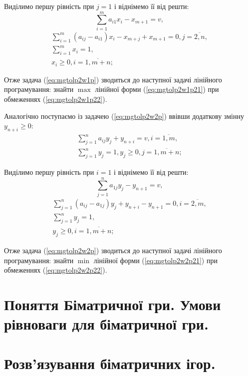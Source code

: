 \documentclass[12pt,a4paper]{report}
\begin{document}
Виділимо першу рівність при $j=1$ і віднімемо її від решти:
\begin{equation} \sum_{i=1}^m a_{i 1} x_i  - x_{m+1} = v, \label{eq:mgtolp2w1p21} \end{equation}
\begin{equation}
\begin{array}{l}
\displaystyle \sum_{i=1}^m (a_{ij} - a_{i 1}) x_i  - x_{m+j} + x_{m+1} = 0,  j=\overline{2,n},\\
\displaystyle \sum_{i=1}^m x_i = 1,\\
x_i \geq 0, i=\overline{1,m+n};
\end{array}
\label{eq:mgtolp2w1p22}
\end{equation}

Отже задача (\ref{eq:mgtolp2w1p}) зводиться до наступної задачі лінійного програмування: знайти $\max$ лінійної форми (\ref{eq:mgtolp2w1p21}) при обмеженнях (\ref{eq:mgtolp2w1p22}).

Аналогічно поступаємо із задачею (\ref{eq:mgtolp2w2p}) ввівши додаткову змінну $y_{n+i} \geq 0$:
\[ \begin{array}{l}
\displaystyle \sum_{j=1}^n a_{ij} y_j + y_{n+i} = v,  i=\overline{1,m},\\
\displaystyle \sum_{j=1}^n y_j = 1, y_j \geq 0, j=\overline{1,m+n};
\end{array} \]

Виділимо першу рівність при $i=1$ і віднімемо її від решти:
\begin{equation} \sum_{j=1}^n a_{1 j} y_j  - y_{n+1} = v, \label{eq:mgtolp2w2p21} \end{equation}
\begin{equation}
\begin{array}{l}
\displaystyle \sum_{j=1}^n (a_{ij} - a_{1 j}) y_j  + y_{n+i} - y_{n+1} = 0,  i=\overline{2,m},\\
\displaystyle \sum_{j=1}^n y_j = 1,\\
y_j \geq 0, i=\overline{1,m+n};
\end{array}
\label{eq:mgtolp2w2p22}
\end{equation}

Отже задача (\ref{eq:mgtolp2w2p}) зводиться до наступної задачі лінійного програмування: знайти $\min$ лінійної форми (\ref{eq:mgtolp2w2p21}) при обмеженнях (\ref{eq:mgtolp2w2p22}).

\clearpage

\chapter{Поняття Біматричної гри. Умови рівноваги для біматричної гри.}

\clearpage

\chapter{Розв'язування біматричних ігор.}
\end{document}
